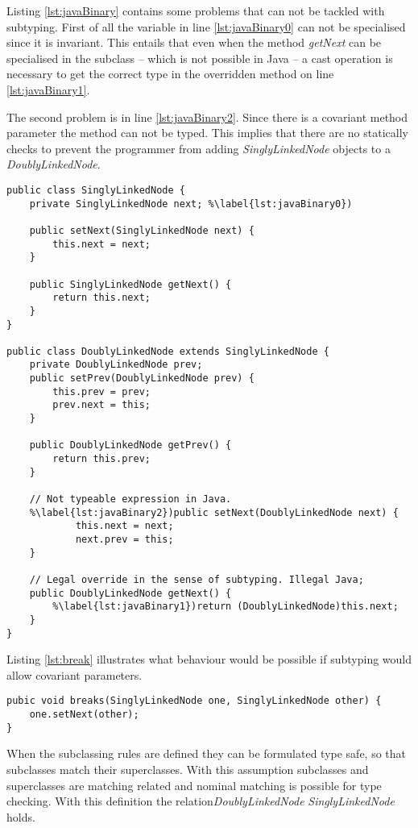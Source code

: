 Listing \ref{lst:javaBinary} contains some problems that can not be tackled
with subtyping. First of all the variable in line \ref{lst:javaBinary0} can
not be specialised since it is invariant. This entails that even when the 
method \emph{getNext} can be specialised in the subclass -- which is not possible
in Java -- a cast operation is necessary to get the correct type in the overridden 
method on line \ref{lst:javaBinary1}.

The second problem is in line \ref{lst:javaBinary2}. Since there is a covariant 
method parameter the method can not be typed. This implies that there are no statically
checks to prevent the programmer from adding \emph{SinglyLinkedNode} objects to a 
\emph{DoublyLinkedNode}.

\begin{lstlisting}[float,caption={Illegal subtyping of binary methods in Java},label={lst:javaBinary}]
public class SinglyLinkedNode {
	private SinglyLinkedNode next; %\label{lst:javaBinary0})

	public setNext(SinglyLinkedNode next) {
		this.next = next;
	}

	public SinglyLinkedNode getNext() {
		return this.next;
	}
}

public class DoublyLinkedNode extends SinglyLinkedNode {
	private DoublyLinkedNode prev;
	public setPrev(DoublyLinkedNode prev) {
		this.prev = prev;
		prev.next = this;
	}

	public DoublyLinkedNode getPrev() {
		return this.prev;
	}
	
	// Not typeable expression in Java.
	%\label{lst:javaBinary2})public setNext(DoublyLinkedNode next) {
			this.next = next;
			next.prev = this;
	}

	// Legal override in the sense of subtyping. Illegal Java;
	public DoublyLinkedNode getNext() {
		%\label{lst:javaBinary1})return (DoublyLinkedNode)this.next;
	}
}
\end{lstlisting}

Listing \ref{lst:break} illustrates what behaviour would be possible if subtyping 
would allow covariant parameters.

\begin{lstlisting}[float,label={lst:break},caption={Breaking a doubly linked node}]
pubic void breaks(SinglyLinkedNode one, SinglyLinkedNode other) {
	one.setNext(other);
}
\end{lstlisting}

When the subclassing rules are defined they can be formulated
type safe, so that subclasses match their superclasses. With
this assumption subclasses and superclasses are matching related and
nominal matching is possible for type checking. With this definition
the relation\emph{DoublyLinkedNode} \match \emph{SinglyLinkedNode} holds.

